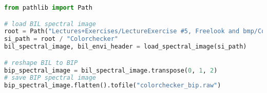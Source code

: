 \begin{lstlisting}[language=python, caption=Load spectral image of coin, label={code:save-bip}]
from pathlib import Path

# load BIL spectral image
root = Path("Lectures+Exercises/LectureExercise #5, Freelook and bmp/Colorchecker 121 ms (for Freelook demo)/capture/")
si_path = root / "Colorchecker"
bil_spectral_image, bil_envi_header = load_spectral_image(si_path)

# reshape BIL to BIP
bip_spectral_image = bil_spectral_image.transpose(0, 1, 2)
# save BIP spectral image
bip_spectral_image.flatten().tofile("colorchecker_bip.raw")

\end{lstlisting}